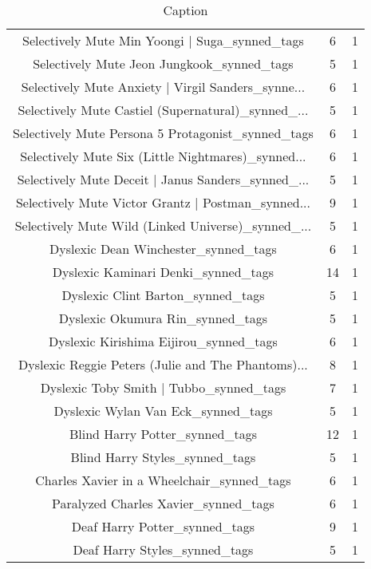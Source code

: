 \begin{table}[h!]
{\begin{tabular}{|c|c|c|}
    Selectively Mute Min Yoongi | Suga\_synned\_tags &           6 &          1 \\
        Selectively Mute Jeon Jungkook\_synned\_tags &           5 &          1 \\
Selectively Mute Anxiety | Virgil Sanders\_synne... &           6 &          1 \\
Selectively Mute Castiel (Supernatural)\_synned\_... &           5 &          1 \\
Selectively Mute Persona 5 Protagonist\_synned\_tags &           6 &          1 \\
Selectively Mute Six (Little Nightmares)\_synned... &           6 &          1 \\
Selectively Mute Deceit | Janus Sanders\_synned\_... &           5 &          1 \\
Selectively Mute Victor Grantz | Postman\_synned... &           9 &          1 \\
Selectively Mute Wild (Linked Universe)\_synned\_... &           5 &          1 \\
              Dyslexic Dean Winchester\_synned\_tags &           6 &          1 \\
               Dyslexic Kaminari Denki\_synned\_tags &          14 &          1 \\
                 Dyslexic Clint Barton\_synned\_tags &           5 &          1 \\
                  Dyslexic Okumura Rin\_synned\_tags &           5 &          1 \\
            Dyslexic Kirishima Eijirou\_synned\_tags &           6 &          1 \\
Dyslexic Reggie Peters (Julie and The Phantoms)... &           8 &          1 \\
           Dyslexic Toby Smith | Tubbo\_synned\_tags &           7 &          1 \\
                Dyslexic Wylan Van Eck\_synned\_tags &           5 &          1 \\
                    Blind Harry Potter\_synned\_tags &          12 &          1 \\
                    Blind Harry Styles\_synned\_tags &           5 &          1 \\
        Charles Xavier in a Wheelchair\_synned\_tags &           6 &          1 \\
              Paralyzed Charles Xavier\_synned\_tags &           6 &          1 \\
                     Deaf Harry Potter\_synned\_tags &           9 &          1 \\
                     Deaf Harry Styles\_synned\_tags &           5 &          1 \\
\hline
\end{tabular}}
 \caption{Caption}
 \label{tab:my_label}
\end{table}
